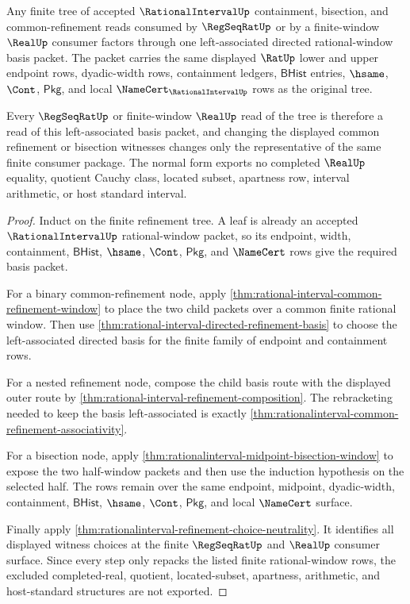 \begin{theorem}
\label{thm:rationalinterval-refinement-normal-form}
Any finite tree of accepted $\RationalIntervalUp$ containment,
bisection, and common-refinement reads consumed by $\RegSeqRatUp$ or by a
finite-window $\RealUp$ consumer factors through one left-associated directed
rational-window basis packet. The packet carries the same displayed $\RatUp$
lower and upper endpoint rows, dyadic-width rows, containment ledgers,
$\mathsf{BHist}$ entries, $\hsame$, $\Cont$, $\mathsf{Pkg}$, and local
$\NameCert_{\RationalIntervalUp}$ rows as the original tree.

Every $\RegSeqRatUp$ or finite-window $\RealUp$ read of the tree is therefore a
read of this left-associated basis packet, and changing the displayed common
refinement or bisection witnesses changes only the representative of the same
finite consumer package. The normal form exports no completed $\RealUp$
equality, quotient Cauchy class, located subset, apartness row, interval
arithmetic, or host standard interval.
\end{theorem}
\begin{proof}
Induct on the finite refinement tree. A leaf is already an accepted
$\RationalIntervalUp$ rational-window packet, so its endpoint, width,
containment, $\mathsf{BHist}$, $\hsame$, $\Cont$, $\mathsf{Pkg}$, and
$\NameCert$ rows give the required basis packet.

For a binary common-refinement node, apply
\autoref{thm:rational-interval-common-refinement-window} to place the two child
packets over a common finite rational window. Then use
\autoref{thm:rational-interval-directed-refinement-basis} to choose the
left-associated directed basis for the finite family of endpoint and
containment rows.

For a nested refinement node, compose the child basis route with the displayed
outer route by \autoref{thm:rational-interval-refinement-composition}. The
rebracketing needed to keep the basis left-associated is exactly
\autoref{thm:rationalinterval-common-refinement-associativity}.

For a bisection node, apply
\autoref{thm:rationalinterval-midpoint-bisection-window} to expose the two
half-window packets and then use the induction hypothesis on the selected
half. The rows remain over the same endpoint, midpoint, dyadic-width,
containment, $\mathsf{BHist}$, $\hsame$, $\Cont$, $\mathsf{Pkg}$, and local
$\NameCert$ surface.

Finally apply \autoref{thm:rationalinterval-refinement-choice-neutrality}. It
identifies all displayed witness choices at the finite $\RegSeqRatUp$ and
$\RealUp$ consumer surface. Since every step only repacks the listed finite
rational-window rows, the excluded completed-real, quotient, located-subset,
apartness, arithmetic, and host-standard structures are not exported.
\end{proof}

